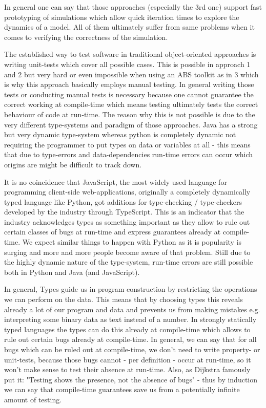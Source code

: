 In general one can say that those approaches (especially the 3rd one) support fast prototyping of simulations which allow quick iteration times to explore the dynamics of a model. All of them ultimately suffer from same problems when it comes to verifying the correctness of the simulation.

The established way to test software in traditional object-oriented approaches is writing unit-tests which cover all possible cases. This is possible in approach 1 and 2 but very hard or even impossible when using an ABS toolkit as in 3 which is why this approach basically employs manual testing. In general writing those tests or conducting manual tests is necessary because one cannot guarantee the correct working at compile-time which means testing ultimately tests the correct behaviour of code at run-time. The reason why this is not possible is due to the very different type-systems and paradigm of those approaches. Java has a strong but very dynamic type-system whereas python is completely dynamic not requiring the programmer to put types on data or variables at all - this means that due to type-errors and data-dependencies run-time errors can occur which origins are might be difficult to track down.

It is no coincidence that JavaScript, the most widely used language for programming client-side web-applications, originally a completely dynamically typed language like Python, got additions for type-checking / type-checkers developed by the industry through TypeScript. This is an indicator that the industry acknowledges types as something important as they allow to rule out certain classes of bugs at run-time and express guarantees already at compile-time. We expect similar things to happen with Python as it is popularity is surging and more and more people become aware of that problem. Still due to the highly dynamic nature of the type-system, run-time errors are still possible both in Python and Java (and JavaScript). 

In general, Types guide us in program construction by restricting the operations we can perform on the data. This means that by choosing types this reveals already a lot of our program and data and prevents us from making mistakes e.g. interpreting some binary data as text instead of a number. In strongly statically typed languages the types can do this already at compile-time which allows to rule out certain bugs already at compile-time. In general, we can say that for all bugs which can be ruled out at compile-time, we don't need to write property- or unit-tests, because those bugs cannot - per definition - occur at run-time, so it won't make sense to test their absence at run-time. Also, as Dijkstra famously put it: "Testing shows the presence, not the absence of bugs" - thus by induction we can say that compile-time guarantees save us from a potentially infinite amount of testing.

